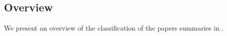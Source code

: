 \subsection{Overview}
\label{sub:overview}
We present an overview of the classification of the papers summaries in .



